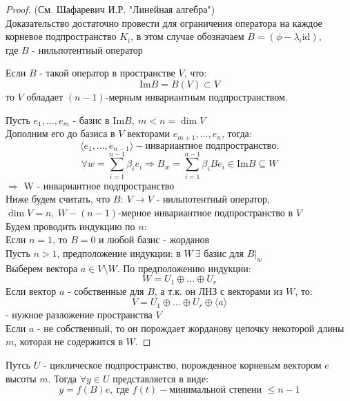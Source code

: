    \begin{proof} (См. Шафаревич И.Р. "Линейная алгебра")\\
        Доказательство достаточно провести для ограничения оператора на каждое корневое подпространство $K_i$, в этом случае обозначаем $B = (\phi - \lambda_i \text{id})$,\\ 
        где $B$ - нильпотентный оператор
        \begin{lemma}
            Если $B$ - такой оператор в пространстве $V$, что: 
            $$\text{Im}B = B(V) \subset V$$
            то $V$ обладает $(n-1)$-мерным инвариантным подпространством.     
        \end{lemma} 
        Пусть $e_1,...,e_m$ - базис в $\text{Im}B, \ m<n = \dim V$\\
        Дополним его до базиса в $V$ векторами $e_{m+1},...,e_n$, тогда:
        $$\langle e_1,...,e_{n-1} \rangle - \text{инвариантное подпространство:}$$
        $$\forall w = \sum \limits_{i=1}^{n-1}\beta_ie_i \Longrightarrow B_w = \sum \limits_{i=1}^{n-1}\beta_iBe_i \in \text{Im}B \subseteq W$$ 
        $\Longrightarrow $ W - инвариантное подпространство\\
        Ниже будем считать, что $B: \ V \to V$ - нильпотентный оператор, \\
        $\dim V = n, \ W - (n-1)$-мерное инвариантное подпространство в $V$\\
        Будем проводить индукцию по $n$:\\
        Если $n=1$, то $B = 0$ и любой базис - жорданов\\
        Пусть $n>1$, предположение индукции: в $W \ \exists$ базис для $B|_w$\\
        Выберем вектора $a \in V\setminus W$. По предположению индукции:
        $$W = U_1 \oplus ... \oplus U_r$$
        Если вектор $a$ - собственные для $B$, а т.к. он ЛНЗ с векторами из $W$, то: 
        $$V = U_1 \oplus ... \oplus U_r \oplus \langle a \rangle$$ 
        - нужное разложение пространства $V$\\
        Если $a$ - не собственный, то он порождает жорданову цепочку некоторой длины $m$, которая не содержится в $W$.          
    \end{proof}
    \begin{lemma}
        Путсь $U$ - циклическое подпространство, порожденное корневым вектором $e$ высоты $m$. Тогда $\forall y \in U$ представляется в виде:
        $$y = f(B)e, \ \text{где } f(t) - \text{минимальной степени } \leq n-1$$     
    \end{lemma} 
   

